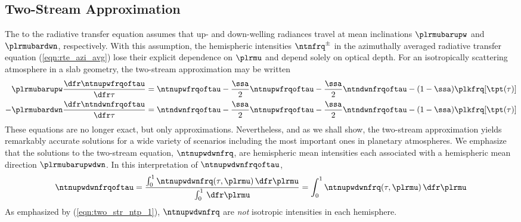 \documentclass[12pt]{article}
\begin{document}
\subsection[Two-Stream Approximation]{Two-Stream Approximation}\label{sxn:two_srm}
The  to the radiative transfer
equation assumes that up- and down-welling radiances travel at mean
inclinations $\plrmubarupw$ and $\plrmubardwn$, respectively.
With this assumption, the hemispheric intensities $\ntnfrq^{\pm}$ in
the azimuthally averaged radiative transfer equation
(\ref{eqn:rte_azi_avg}) lose their explicit dependence on $\plrmu$
and depend solely on optical depth.
For an isotropically scattering atmosphere in a slab geometry,
the two-stream approximation may be written 
\begin{subequations}
\label{eqn:two_str}
\begin{align}
\label{eqn:two_str_upw}
\plrmubarupw \frac{\dfr\ntnupwfrqoftau}{\dfr\tau} & =  
\ntnupwfrqoftau - \frac{\ssa}{2} \ntnupwfrqoftau - \frac{\ssa}{2}
\ntndwnfrqoftau - (1 - \ssa) \plkfrq[\tpt(\tau)] \\
\label{eqn:two_str_dwn}
-\plrmubardwn \frac{\dfr\ntndwnfrqoftau}{\dfr\tau} & =  
\ntndwnfrqoftau - \frac{\ssa}{2} \ntnupwfrqoftau - \frac{\ssa}{2}
\ntndwnfrqoftau - (1 - \ssa) \plkfrq[\tpt(\tau)]
\end{align}
\end{subequations} 
These equations are no longer exact, but only approximations.
Nevertheless, and as we shall show, the two-stream approximation
yields remarkably accurate solutions for a wide variety of scenarios
including the most important ones in planetary atmospheres.
We emphasize that the solutions to the two-stream equation,
$\ntnupwdwnfrq$, are hemispheric mean intensities each associated with
a hemispheric mean direction $\plrmubarupwdwn$.
In this interpretation of $\ntnupwdwnfrqoftau$,
\begin{eqnarray}
\ntnupwdwnfrqoftau = 
\frac{\int_{0}^{1} \ntnupwdwnfrq(\tau,\plrmu)\,\dfr\plrmu}
{\int_{0}^{1}  \,\dfr\plrmu}
= \int_{0}^{1} \ntnupwdwnfrq(\tau,\plrmu)\,\dfr\plrmu
\label{eqn:two_str_ntp_1}
\end{eqnarray}
As emphasized by (\ref{eqn:two_str_ntp_1}), $\ntnupwdwnfrq$ are
\textit{not} isotropic intensities in each hemisphere. 
\end{document}
